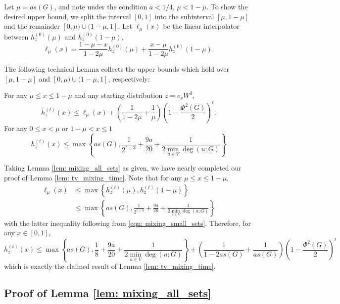 \documentclass[11pt,twoside]{article}
\newcommand{\set}[1]{\left\{#1\right\}}
\newcommand{\1}{\mathbbm{1}}
\begin{document}
Let $\mu = as(G)$, and note under the condition $a < 1/4$, $\mu < 1 - \mu$. To show the desired upper bound, we split the interval $[0,1]$ into the subinterval $[\mu, 1 - \mu]$ and the remainder $[0,\mu) \cup (1 - \mu, 1]$. Let $\ell_{\mu}(x)$ be the linear interpolator between $h_z^{(0)}(\mu)$ and $h_z^{(0)}(1 - \mu)$, 
\begin{equation*}
\ell_{\mu}(x) = \frac{1 - \mu - x}{1 - 2\mu} h_z^{(0)}(\mu) + \frac{x - \mu}{1 - 2\mu}h_z^{(0)}(1 - \mu).
\end{equation*}

The following technical Lemma collects the upper bounds which hold over $[\mu, 1 - \mu]$ and $[0,\mu) \cup (1 - \mu, 1]$, respectively:
\begin{lemma}
	\label{lem: mixing_all_sets}
	For any $\mu \leq x \leq 1 - \mu$ and any starting distribution $z = e_vW^3$,
	\begin{equation}
	\label{eqn: mixing_large_sets}
	h_z^{(t)}(x) \leq \ell_{\mu}(x) + \left(\frac{1}{1 - 2\mu} + \frac{1}{\mu}\right)\left(1 - \frac{\Phi^2(G)}{2}\right)^t.
	\end{equation}
	For any $0 \leq x < \mu$ or $1 - \mu < x \leq 1$
	\begin{equation}
	\label{eqn: mixing_small_sets}
	h_z^{(t)}(x) \leq \max\set{as(G), \frac{1}{2^{t+3}} + \frac{9a}{20} + \frac{1}{2 \min_{u \in V}\deg(u;G)} }
	\end{equation}
\end{lemma}
\noindent Taking Lemma \ref{lem: mixing_all_sets} as given, we have nearly completed our proof of Lemma \ref{lem: tv_mixing_time}. Note that for any $\mu \leq x \leq 1 - \mu$,
\begin{align*}
\ell_{\mu}(x) & \leq \max\set{h_z^{(t)}(\mu),h_z^{(t)}(1 - \mu)} \\
& \leq \max\set{as(G), \frac{1}{2^{t + 3}} + \frac{9a}{20} + \frac{1}{2 \min_{u \in V}\deg(u;G)} }
\end{align*}
with the latter inequality following from \eqref{eqn: mixing_small_sets}. Therefore, for any $x \in [0,1]$,
\begin{equation*}
h_z^{(t)}(x) \leq \max\set{as(G), \frac{1}{8} + \frac{9a}{20} + \frac{1}{2 \min_{u \in V}\deg(u;G)} } + \left(\frac{1}{1 - 2as(G)} + \frac{1}{as(G)}\right)\left(1 - \frac{\Phi^2(G)}{2}\right)^t
\end{equation*}
which is exactly the claimed result of Lemma \ref{lem: tv_mixing_time}.

\subsection{Proof of Lemma \ref{lem: mixing_all_sets}}
\end{document}

